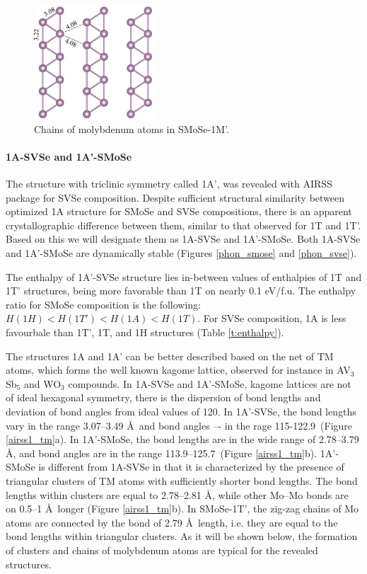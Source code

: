 \documentclass[a4paperm]{article}
\begin{document}
\begin{figure}[H]
	\includegraphics[width=0.4\textwidth]{H-hor_Mo.png}
	\caption{Chains of molybdenum atoms in SMoSe-1M'.}
	\label{H-hor_Mo}
\end{figure} 


\paragraph{1A-SVSe and 1A'-SMoSe}
The structure with triclinic symmetry called 1A', was revealed with AIRSS package for SVSe composition.
Despite sufficient structural similarity between optimized 1A structure for SMoSe and SVSe compositions, there is an apparent crystallographic difference between them, similar to that observed for 1T and 1T'.
Based on this we will designate them as 1A-SVSe and 1A'-SMoSe.
Both 1A-SVSe and 1A'-SMoSe are dynamically stable (Figures \ref{phon_smose} and \ref{phon_svse}).

The enthalpy of 1A'-SVSe structure lies in-between values of enthalpies of 1T and 1T' structures, being more favorable than 1T on nearly 0.1 eV/f.u.
The enthalpy ratio for SMoSe composition is the following: 
$H(1H) < H(1T') < H(1A) < H (1T)$.
For SVSe composition, 1A is less favourbale than 1T', 1T, and 1H structures (Table \ref{t:enthalpy}).


The structures 1A and 1A' can be better described based on the net of TM atoms, which forms the well known kagome lattice\cite{zhang2021_kagome}, observed for instance in AV$_3$Sb$_5$ \cite{ortiz2021} and WO$_3$ \cite{gerand1979} compounds.
In 1A-SVSe and 1A'-SMoSe, kagome lattices are not of ideal hexagonal symmetry, there is the dispersion of bond lengths and deviation of bond angles from ideal values of 120\textdegree.
In 1A'-SVSe, the bond lengths vary in the range 3.07--3.49 \AA\ and bond angles –- in the rage 115-122.9\textdegree\ (Figure \ref{airss1_tm}a).
In 1A'-SMoSe, the bond lengths are in the wide range of 2.78--3.79 \AA, and bond angles are in the range 113.9--125.7\textdegree\ (Figure \ref{airss1_tm}b).
1A'-SMoSe is different from 1A-SVSe in that it is characterized by the presence of triangular clusters of TM atoms with sufficiently shorter bond lengths.
The bond lengths within clusters are equal to 2.78--2.81 \AA, while other Mo--Mo bonds are on 0.5--1 \AA\ longer (Figure \ref{airss1_tm}b).
In SMoSe-1T', the zig-zag chains of Mo atoms are connected by the bond of 2.79 \AA\ length, i.e. they are equal to the bond lengths within triangular clusters.
As it will be shown below, the formation of clusters and chains of molybdenum atoms are typical for the revealed structures.
\end{document}
